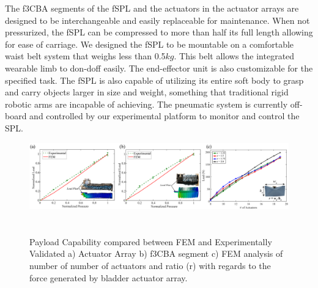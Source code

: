 \documentclass[letterpaper, 10 pt, conference]{ieeeconf}  %
\begin{document}
The f3CBA segments of the fSPL and the actuators in the actuator arrays are designed to be interchangeable and easily replaceable for maintenance. When not pressurized, the fSPL can be compressed to more than half its full length allowing for ease of carriage. We designed the fSPL to be mountable on a comfortable waist belt system that weighs less than 0.5$kg$. This belt allows the integrated wearable limb to don-doff easily. The end-effector unit is also customizable for the specified task. The fSPL is also capable of utilizing its entire soft body to grasp and carry objects larger in size and weight, something that traditional rigid robotic arms are incapable of achieving. The pneumatic system is currently off-board and controlled by our experimental platform \cite{nguyen2018} to monitor and control the SPL.












\begin{figure}[t!]
\centering
\includegraphics[width=1.0\textwidth]{Figures/load_and_optimization_v2}
\caption{Payload Capability compared between FEM and Experimentally Validated a) Actuator Array b) f3CBA segment c) FEM analysis of number of number of actuators and ratio (r) with regards to the force generated by bladder actuator array.}
\label{fig:opti_payload}
\section{\vspace{-1.5em}}
\end{figure}
\end{document}
